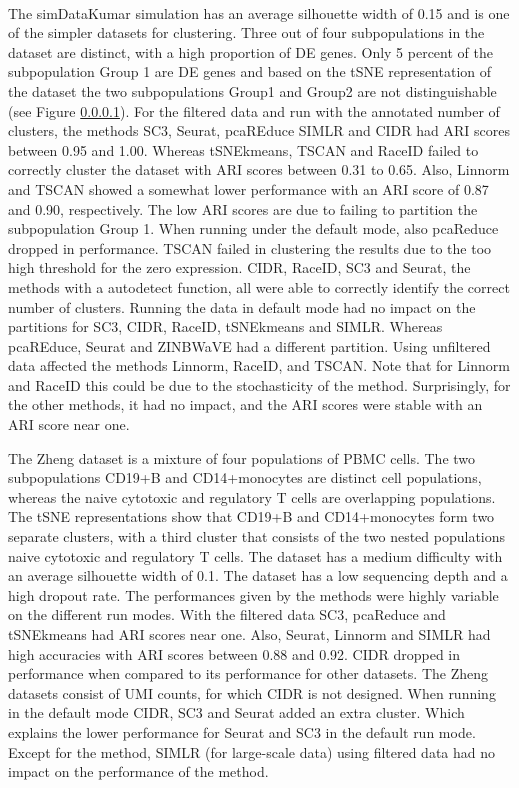 \documentclass[12pt, a4paper]{article}\usepackage[]{graphicx}\usepackage[]{color}
\begin{document}
\paragraph{}
The simDataKumar simulation has an average silhouette width of 0.15 and is one of the simpler datasets for clustering. Three out of four subpopulations in the dataset are distinct, with a high proportion of DE genes. Only 5 percent of the subpopulation Group 1 are DE genes and based on the tSNE representation of the dataset the two subpopulations Group1 and Group2 are not distinguishable (see Figure \ref{}). For the filtered data and run with the annotated number of clusters, the methods SC3, Seurat, pcaREduce SIMLR and CIDR had ARI scores between 0.95 and 1.00. Whereas tSNEkmeans, TSCAN and RaceID failed to correctly cluster the dataset with ARI scores between 0.31 to 0.65. Also, Linnorm and TSCAN showed a somewhat lower performance with an ARI score of 0.87 and 0.90, respectively.  The low ARI scores are due to failing to partition the subpopulation Group 1.
When running under the default mode, also pcaReduce dropped in performance. TSCAN failed in clustering the results due to the too high threshold for the zero expression.
CIDR, RaceID, SC3 and Seurat, the methods with a autodetect function, all were able to correctly identify the correct number of clusters.  Running the data in default mode had no impact on the partitions for SC3, CIDR, RaceID, tSNEkmeans and SIMLR. Whereas pcaREduce, Seurat and  ZINBWaVE had a different partition. Using unfiltered data affected the methods Linnorm, RaceID, and  TSCAN. Note that for Linnorm and RaceID this could be due to the stochasticity of the method. Surprisingly, for the other methods, it had no impact, and the ARI scores were stable with an ARI score near one.

The Zheng dataset is a mixture of four populations of PBMC cells. The two subpopulations CD19+B and CD14+monocytes are distinct cell populations, whereas the naive cytotoxic and regulatory T cells are overlapping populations. The tSNE representations show that CD19+B and CD14+monocytes form two separate clusters, with a third cluster that consists of the two nested populations naive cytotoxic and regulatory T cells. The dataset has a medium difficulty with an average silhouette width of 0.1. The dataset has a low sequencing depth and a high dropout rate. 
The performances given by the methods were highly variable on the different run modes. With the filtered data SC3, pcaReduce and tSNEkmeans had ARI scores near one.  Also, Seurat, Linnorm and SIMLR had high accuracies with ARI scores between 0.88 and 0.92. CIDR dropped in performance when compared to its performance for other datasets. The Zheng datasets consist of UMI counts, for which CIDR is not designed. 
When running in the default mode CIDR, SC3 and Seurat added an extra cluster. Which explains the lower performance for Seurat and SC3 in the default run mode. 
Except for the method, SIMLR (for large-scale data) using filtered data had no impact on the performance of the method.
\end{document}
